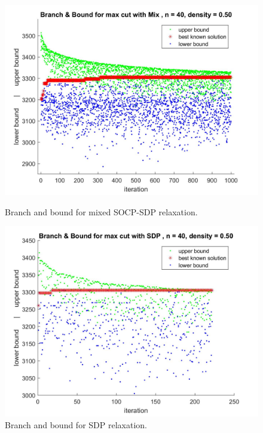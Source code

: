 \documentclass[12pt]{book}
\theoremstyle{definition}
\begin{document}
\begin{center}
\begin{figure}
\includegraphics[scale=0.27]{img/bnb_mix_n40_d50_1.jpg}
\caption[Branch and bound for mixed SOCP-SDP relaxation]{Branch and bound for mixed SOCP-SDP relaxation. }

\includegraphics[scale=0.27]{img/bnb_sdp_n40_d50_1.jpg}
\caption[Branch and bound for SDP relaxation]{Branch and bound for SDP relaxation. }
\end{figure}
\end{center}
\end{document}
